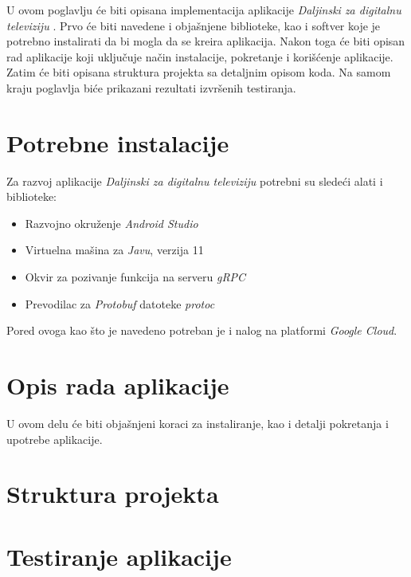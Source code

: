 \documentclass[../TamaraIvanovicMasterRad.tex]{subfiles}
\begin{document}
U ovom poglavlju će biti opisana implementacija aplikacije \textit{Daljinski za digitalnu televiziju} \cite{sajt:remoteApp}. Prvo će biti navedene i objašnjene biblioteke, kao i softver koje je potrebno instalirati da bi mogla da se kreira aplikacija. Nakon toga će biti opisan rad aplikacije koji uključuje način instalacije, pokretanje i korišćenje aplikacije. Zatim će biti opisana struktura projekta sa detaljnim opisom koda. Na samom kraju poglavlja biće prikazani rezultati izvršenih testiranja.

\section{Potrebne instalacije} 
Za razvoj aplikacije \textit{Daljinski za digitalnu televiziju} potrebni su sledeći alati i biblioteke:
\begin{itemize}
    \item Razvojno okruženje \textit{Android Studio}
    \item Virtuelna mašina za \textit{Javu}, verzija 11
    \item Okvir za pozivanje funkcija na serveru \textit{gRPC}
    \item Prevodilac za \textit{Protobuf} datoteke \textit{protoc} \cite{sajt:protoc}
\end{itemize}
Pored ovoga kao što je navedeno potreban je i nalog na platformi \textit{Google Cloud}.
\section{Opis rada aplikacije} \label{opis_rada}
U ovom delu će biti objašnjeni koraci za instaliranje, kao i detalji pokretanja i upotrebe aplikacije. 





\section{Struktura projekta}



\section{Testiranje aplikacije}

\end{document}
